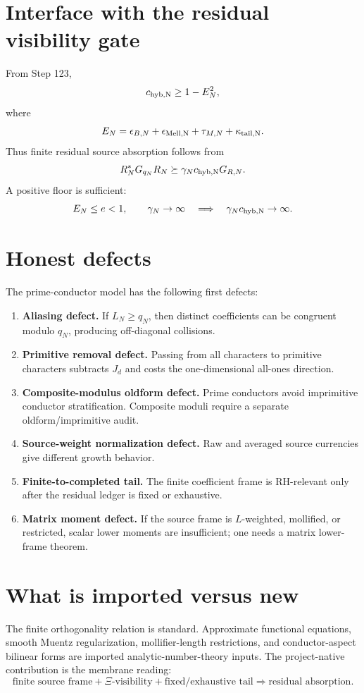 \documentclass[11pt]{article}
\begin{document}
\section{Interface with the residual visibility gate}
From Step 123,
\[
c_{\rm hyb,N}\ge 1-E_N^2,
\]
where
\[
E_N=\epsilon_{B,N}+\epsilon_{\rm Mell,N}+\tau_{M,N}+\kappa_{\rm tail,N}.
\]
Thus finite residual source absorption follows from
\[
R_N^*G_{q_N}R_N\succeq \gamma_N c_{\rm hyb,N}G_{R,N}.
\]
A positive floor is sufficient:
\[
E_N\le e<1,
\qquad
\gamma_N\to\infty
\quad\Longrightarrow\quad
\gamma_Nc_{\rm hyb,N}\to\infty.
\]

\section{Honest defects}
The prime-conductor model has the following first defects:
\begin{enumerate}[leftmargin=2em]
\item \textbf{Aliasing defect.} If $L_N\ge q_N$, then distinct coefficients can be congruent modulo $q_N$, producing off-diagonal collisions.
\item \textbf{Primitive removal defect.} Passing from all characters to primitive characters subtracts $J_d$ and costs the one-dimensional all-ones direction.
\item \textbf{Composite-modulus oldform defect.} Prime conductors avoid imprimitive conductor stratification. Composite moduli require a separate oldform/imprimitive audit.
\item \textbf{Source-weight normalization defect.} Raw and averaged source currencies give different growth behavior.
\item \textbf{Finite-to-completed tail.} The finite coefficient frame is RH-relevant only after the residual ledger is fixed or exhaustive.
\item \textbf{Matrix moment defect.} If the source frame is $L$-weighted, mollified, or restricted, scalar lower moments are insufficient; one needs a matrix lower-frame theorem.
\end{enumerate}

\section{What is imported versus new}
The finite orthogonality relation is standard.  Approximate functional equations, smooth Muentz regularization, mollifier-length restrictions, and conductor-aspect bilinear forms are imported analytic-number-theory inputs.  The project-native contribution is the membrane reading:
\[
\text{finite source frame} + \Xi\text{-visibility} + \text{fixed/exhaustive tail} \Rightarrow \text{residual absorption}.
\]
\end{document}
